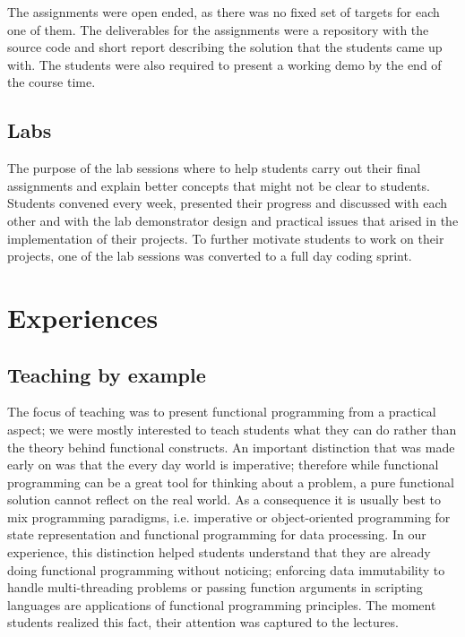 \documentclass[conference]{IEEEtran}
\begin{document}
The assignments were open ended, as there was no fixed set of targets for
each one of them. The deliverables for the assignments were a repository
with the source code and short report describing the solution that the
students came up with. The students were also required to present a working
demo by the end of the course time.

\subsection{Labs}

The purpose of the lab sessions where to help students carry out their final
assignments and explain better concepts that might not be clear to students. 
Students convened every week, presented their progress and discussed with 
each other and with the lab demonstrator design and practical issues that
arised in the implementation of their projects. To further motivate students
to work on their projects, one of the lab sessions was converted to a full
day coding sprint.

\section{Experiences}

\subsection{Teaching by example}

The focus of teaching was to present functional programming from a practical
aspect; we were mostly interested to teach students what they can do rather than
the theory behind functional constructs. An important distinction
that was made early on was that the every day world is imperative; therefore
while functional programming can be a great tool for thinking about a problem, a
pure functional solution cannot reflect on the real world. As a consequence it
is usually best to mix programming paradigms, i.e. imperative or object-oriented
programming for state representation and functional programming for data
processing. In our experience, this distinction helped students understand
that they are already doing functional programming without noticing;
enforcing data immutability to handle multi-threading problems or passing
function arguments in scripting languages are applications of functional
programming principles. The moment students realized this fact, their
attention was captured to the lectures.
\end{document}
